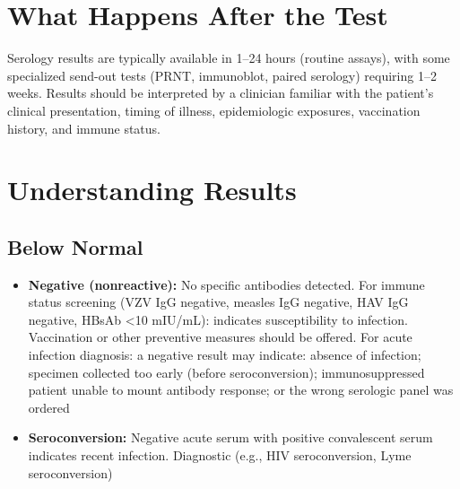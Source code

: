 \section*{What Happens After the Test}
Serology results are typically available in 1--24 hours (routine assays), with some specialized send-out tests (PRNT, immunoblot, paired serology) requiring 1--2 weeks. Results should be interpreted by a clinician familiar with the patient's clinical presentation, timing of illness, epidemiologic exposures, vaccination history, and immune status.

\section*{Understanding Results}

\subsection*{Below Normal}
\begin{itemize}
  \item \textbf{Negative (nonreactive):} No specific antibodies detected. For immune status screening (VZV IgG negative, measles IgG negative, HAV IgG negative, HBsAb <10 mIU/mL): indicates susceptibility to infection. Vaccination or other preventive measures should be offered. For acute infection diagnosis: a negative result may indicate: absence of infection; specimen collected too early (before seroconversion); immunosuppressed patient unable to mount antibody response; or the wrong serologic panel was ordered
  \item \textbf{Seroconversion:} Negative acute serum with positive convalescent serum indicates recent infection. Diagnostic (e.g., HIV seroconversion, Lyme seroconversion)
\end{itemize}

